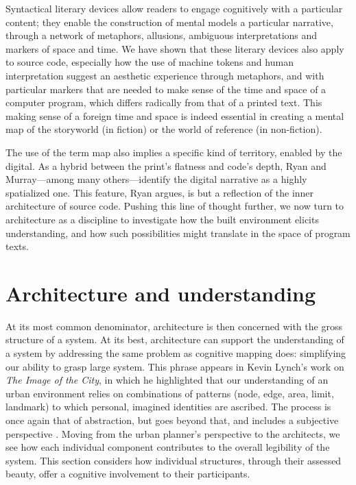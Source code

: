 \spacer

Syntactical literary devices allow readers to engage cognitively with a particular content; they enable the construction of mental models a particular narrative, through a network of metaphors, allusions, ambiguous interpretations and markers of space and time. We have shown that these literary devices also apply to source code, especially how the use of machine tokens and human interpretation suggest an aesthetic experience through metaphors, and with particular markers that are needed to make sense of the time and space of a computer program, which differs radically from that of a printed text. This making sense of a foreign time and space is indeed essential in creating a mental map of the storyworld (in fiction) or the world of reference (in non-fiction).

The use of the term map also implies a specific kind of territory, enabled by the digital. As a hybrid between the print's flatness and code's depth, Ryan and Murray—among many others—identify the digital narrative as a highly spatialized one. This feature, Ryan argues, is but a reflection of the inner architecture of source code. Pushing this line of thought further, we now turn to architecture as a discipline to investigate how the built environment elicits understanding, and how such possibilities might translate in the space of program texts.

\section{Architecture and understanding}
\label{sec:arch-understanding}

At its most common denominator, architecture is then concerned with the gross structure of a system. At its best, architecture can support the understanding of a system by addressing the same problem as cognitive mapping does: simplifying our ability to grasp large system. This phrase appears in Kevin Lynch's work on \emph{The Image of the City}, in which he highlighted that our understanding of an urban environment relies on combinations of patterns (node, edge, area, limit, landmark) to which personal, imagined identities are ascribed. The process is once again that of abstraction, but goes beyond that, and includes a subjective perspective \citep{lynch_image_1959}. Moving from the urban planner's perspective to the architects, we see how each individual component contributes to the overall legibility of the system. This section considers how individual structures, through their assessed beauty, offer a cognitive involvement to their participants.

